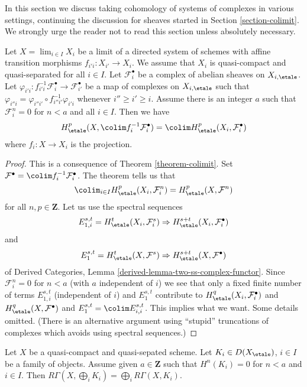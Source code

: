 \noindent
In this section we discuss taking cohomology of systems of complexes
in various settings, continuing the discussion for sheaves started
in Section \ref{section-colimit}.
We strongly urge the reader not to read this section unless absolutely
necessary.

\begin{lemma}
\label{lemma-colimit-variant-complexes}
Let $X = \lim_{i \in I} X_i$ be a limit of a directed system of schemes
with affine transition morphisms $f_{i'i} : X_{i'} \to X_i$. We assume
that $X_i$ is quasi-compact and quasi-separated for all $i \in I$.
Let $\mathcal{F}_i^\bullet$ be a complex of abelian sheaves on
$X_{i, \etale}$. Let $\varphi_{i'i} : f_{i'i}^{-1}\mathcal{F}_i^\bullet \to
\mathcal{F}_{i'}^\bullet$ be a map of complexes on $X_{i, \etale}$
such that $\varphi_{i''i} = \varphi_{i''i'} \circ f_{i'' i'}^{-1}\varphi_{i'i}$
whenever $i'' \geq i' \geq i$. Assume there is an integer $a$ such that
$\mathcal{F}_i^n = 0$ for $n < a$ and all $i \in I$.
Then we have
$$
H^p_\etale(X, \colim f_i^{-1}\mathcal{F}_i^\bullet) =
\colim H^p_\etale(X_i, \mathcal{F}^\bullet_i)
$$
where $f_i : X \to X_i$ is the projection.
\end{lemma}

\begin{proof}
This is a consequence of Theorem \ref{theorem-colimit}. Set
$\mathcal{F}^\bullet = \colim f_i^{-1}\mathcal{F}_i^\bullet$.
The theorem tells us that
$$
\colim_{i \in I} H_\etale^p(X_i, \mathcal{F}_i^n) =
H_\etale^p(X, \mathcal{F}^n)
$$
for all $n, p \in \mathbf{Z}$. Let us use the spectral sequences
$$
E_{1, i}^{s, t} = H_\etale^t(X_i, \mathcal{F}_i^s) \Rightarrow
H_\etale^{s + t}(X_i, \mathcal{F}_i^\bullet)
$$
and
$$
E_1^{s, t} = H_\etale^t(X, \mathcal{F}^s) \Rightarrow
H_\etale^{s + t}(X, \mathcal{F}^\bullet)
$$
of Derived Categories, Lemma \ref{derived-lemma-two-ss-complex-functor}.
Since $\mathcal{F}_i^n = 0$ for $n < a$ (with $a$ independent of $i$)
we see that only a fixed finite number of terms $E_{1, i}^{s, t}$
(independent of $i$) and $E_1^{s, t}$ contribute to
$H^q_\etale(X_i, \mathcal{F}_i^\bullet)$ and
$H^q_\etale(X, \mathcal{F}^\bullet)$ and $E_1^{s, t} = \colim E_{i, i}^{s, t}$.
This implies what we want. Some details omitted.
(There is an alternative argument using ``stupid'' truncations
of complexes which avoids using spectral sequences.)
\end{proof}

\begin{lemma}
\label{lemma-direct-sum-bounded-below-cohomology}
Let $X$ be a quasi-compact and quasi-sepated scheme. Let
$K_i \in D(X_\etale)$, $i \in I$ be a family of objects.
Assume given $a \in \mathbf{Z}$ such that $H^n(K_i) = 0$ for $n < a$
and $i \in I$. Then $R\Gamma(X, \bigoplus_i K_i) =
\bigoplus_i R\Gamma(X, K_i)$.
\end{lemma}

